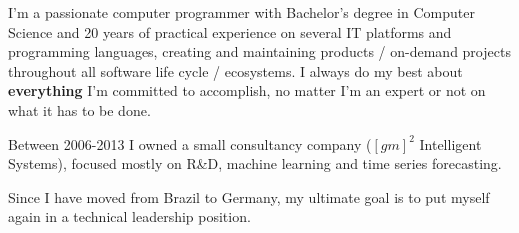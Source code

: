 
\begin{cvparagraph}
I’m a passionate computer programmer with Bachelor’s degree in Computer Science and 20 years
of practical experience on several IT platforms and programming languages, creating and maintaining
products / on-demand projects throughout all software life cycle / ecosystems.
I always do my best about \textbf{everything} I’m committed to accomplish, no matter I’m an expert
or not on what it has to be done.

Between 2006-2013 I owned a small consultancy company
($[gm]^2$ Intelligent Systems), focused mostly on R\&D, machine learning and time series forecasting.

Since I have moved from Brazil to Germany, my ultimate goal is to put myself again in a technical leadership position.

\end{cvparagraph}

